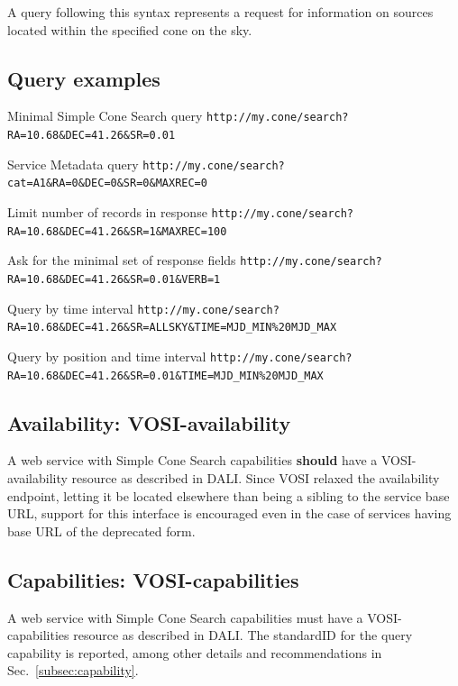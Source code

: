 \documentclass[11pt,a4paper]{ivoa}
\begin{document}
A query following this syntax represents a request for information on
sources located within the specified cone on the sky.

\subsection{Query examples} 

\begin{bigdescription} 
	\item[Minimal Simple Cone Search query]
		\nolinkurl{http://my.cone/search?RA=10.68\&DEC=41.26\&SR=0.01}
	\item[Service Metadata query]
		\nolinkurl{http://my.cone/search?cat=A1\&RA=0\&DEC=0\&SR=0\&MAXREC=0}
	\item[Limit number of records in response] 
		\nolinkurl{http://my.cone/search?RA=10.68\&DEC=41.26\&SR=1\&MAXREC=100}
	\item[Ask for the minimal set of response fields]
		\nolinkurl{http://my.cone/search?RA=10.68\&DEC=41.26\&SR=0.01\&VERB=1}
	\item[Query by time interval]
		\nolinkurl{http://my.cone/search?RA=10.68\&DEC=41.26\&SR=ALLSKY&TIME=MJD\_MIN\%20MJD\_MAX} 
	\item[Query by position and time interval]
		\nolinkurl{http://my.cone/search?RA=10.68\&DEC=41.26\&SR=0.01&TIME=MJD\_MIN\%20MJD\_MAX} 
\end{bigdescription}

\subsection{Availability: VOSI-availability} A web service with Simple
Cone Search capabilities \textbf{should} have a VOSI-availability
resource as described in DALI. Since VOSI relaxed the availability
endpoint, letting it be located elsewhere than being a sibling to the
service base URL, support for this interface is encouraged even in the
case of services having base URL of the deprecated form.

\subsection{Capabilities: VOSI-capabilities} A web service with Simple
Cone Search capabilities must have a VOSI-capabilities resource as
described in DALI. The standardID for the {query} capability is
reported, among other details and recommendations in
Sec.~\ref{subsec:capability}.
\end{document}
